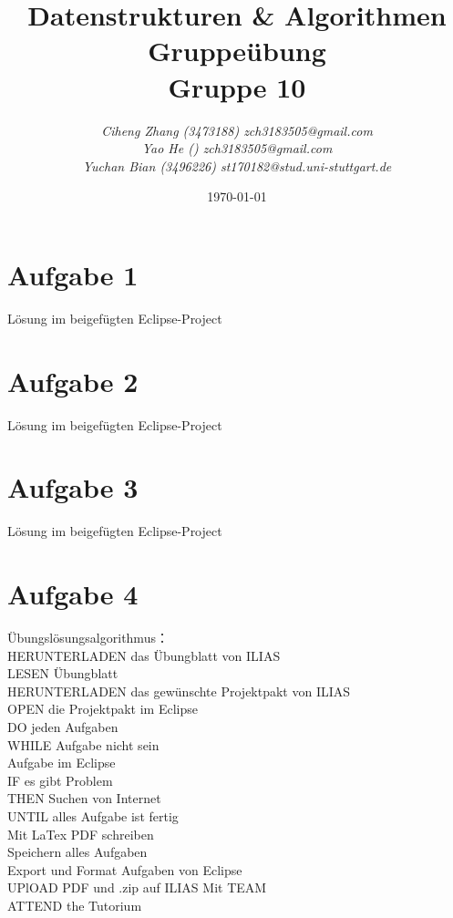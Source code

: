 \documentclass{article}
\begin{document}
\begin{titlepage}
    \title{\Huge \textbf{Datenstrukturen \& Algorithmen Gruppeübung\\Gruppe 10} }
    \author{\LARGE \textsl{Ciheng Zhang (3473188) zch3183505@gmail.com}\\\LARGE \textsl{Yao He () zch3183505@gmail.com}\\\LARGE \textsl{Yuchan Bian (3496226) st170182@stud.uni-stuttgart.de} \\[200pt]}
    \date{\today}
    \maketitle
    \thispagestyle{empty}
\end{titlepage}
\newpage
\section{Aufgabe 1}
Lösung im beigefügten Eclipse-Project
\section{Aufgabe 2}
Lösung im beigefügten Eclipse-Project
\section{Aufgabe 3}
Lösung im beigefügten Eclipse-Project
\section{Aufgabe 4}
Übungslösungsalgorithmus：
\\HERUNTERLADEN das Übungblatt von ILIAS
\\LESEN Übungblatt
\\HERUNTERLADEN das gewünschte Projektpakt von ILIAS
\\OPEN die Projektpakt im Eclipse
\\DO jeden Aufgaben
\\\indent WHILE Aufgabe nicht sein
\\\indent Aufgabe im Eclipse
\\\indent IF es gibt Problem
\\\indent \indent THEN Suchen von Internet
\\\indent UNTIL alles Aufgabe ist fertig
\\Mit LaTex PDF schreiben
\\Speichern alles Aufgaben
\\Export und Format Aufgaben von Eclipse
\\UPlOAD PDF und .zip auf ILIAS Mit TEAM
\\ATTEND the Tutorium
\end{document}
